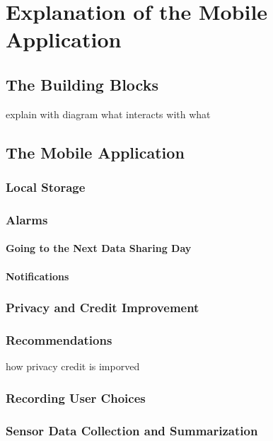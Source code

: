 \chapter{Explanation of the Mobile Application}

\section{The Building Blocks}

explain with diagram what interacts with what

\section{The Mobile Application}

\subsection{Local Storage}

\subsection{Alarms}

\subsubsection{Going to the Next Data Sharing Day}

\subsubsection{Notifications}

\subsection{Privacy and Credit Improvement}

\subsection{Recommendations}
how privacy credit is imporved

\subsection{Recording User Choices}

\subsection{Sensor Data Collection and Summarization}

